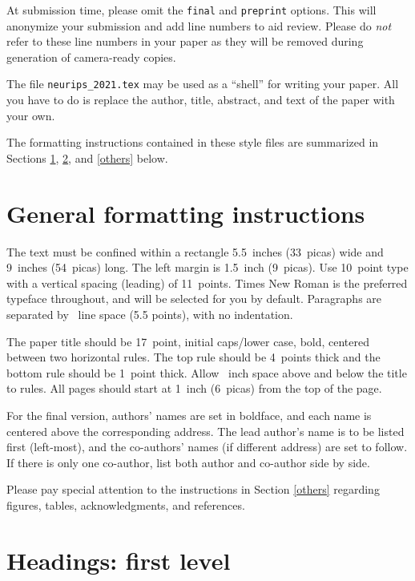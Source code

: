 \documentclass{article}
\begin{document}
	At submission time, please omit the \verb+final+ and \verb+preprint+
	options. This will anonymize your submission and add line numbers to aid
	review. Please do \emph{not} refer to these line numbers in your paper as they
	will be removed during generation of camera-ready copies.
	
	The file \verb+neurips_2021.tex+ may be used as a ``shell'' for writing your
	paper. All you have to do is replace the author, title, abstract, and text of
	the paper with your own.
	
	The formatting instructions contained in these style files are summarized in
	Sections \ref{gen_inst}, \ref{headings}, and \ref{others} below.
	
	\section{General formatting instructions}
	\label{gen_inst}
	
	The text must be confined within a rectangle 5.5~inches (33~picas) wide and
	9~inches (54~picas) long. The left margin is 1.5~inch (9~picas).  Use 10~point
	type with a vertical spacing (leading) of 11~points.  Times New Roman is the
	preferred typeface throughout, and will be selected for you by default.
	Paragraphs are separated by ~line space (5.5 points), with no
	indentation.
	
	The paper title should be 17~point, initial caps/lower case, bold, centered
	between two horizontal rules. The top rule should be 4~points thick and the
	bottom rule should be 1~point thick. Allow ~inch space above and
	below the title to rules. All pages should start at 1~inch (6~picas) from the
	top of the page.
	
	For the final version, authors' names are set in boldface, and each name is
	centered above the corresponding address. The lead author's name is to be listed
	first (left-most), and the co-authors' names (if different address) are set to
	follow. If there is only one co-author, list both author and co-author side by
	side.
	
	Please pay special attention to the instructions in Section \ref{others}
	regarding figures, tables, acknowledgments, and references.
	
	\section{Headings: first level}
	\label{headings}
	
\end{document}
